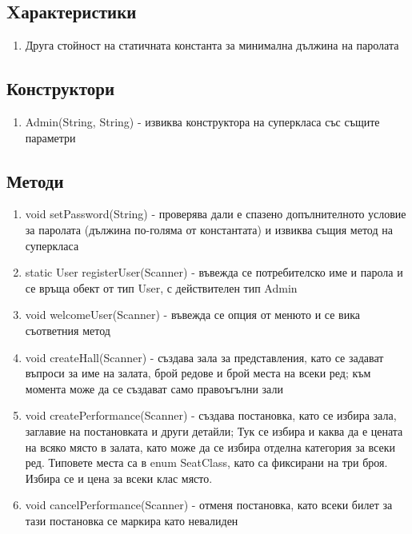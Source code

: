 \documentclass[12pt]{article}
\begin{document}
    \subsection{Xарактеристики}

        \begin{enumerate}
            \item Друга стойност на статичната константа за минимална дължина на паролата
        \end{enumerate}

    \subsection{Конструктори}

        \begin{enumerate}
            \item Admin(String, String) - извиква конструктора на суперкласа със същите параметри
        \end{enumerate}

    \subsection{Методи}

        \begin{enumerate}
            \item void setPassword(String) - проверява дали е спазено допълнителното условие за паролата (дължина по-голяма от константата) и извиква същия метод на суперкласа
            \item static User registerUser(Scanner) - въвежда се потребителско име и парола и се връща обект от тип User, с действителен тип Admin
            \item void welcomeUser(Scanner) - въвежда се опция от менюто и се вика съответния метод
            \item  void createHall(Scanner) - създава зала за представления, като се задават въпроси за име на залата, брой редове и брой места на всеки ред; към момента може да се създават само правоъгълни зали
            \item  void createPerformance(Scanner) - създава постановка, като се избира зала, заглавие на постановката и други детайли; Тук се избира и каква да е цената на всяко място в залата, като може да се избира отделна категория за всеки ред. Типовете места са в enum SeatClass, като са фиксирани на три броя. Избира се и цена за всеки клас място.
            \item  void cancelPerformance(Scanner) - отменя постановка, като всеки билет за тази постановка се маркира като невалиден
        \end{enumerate}
\end{document}
